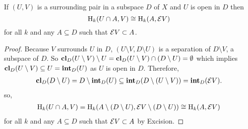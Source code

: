 \begin{lemma}\label{lem:excision}
  If $(U, V)$ is a surrounding pair in a subspace $D$ of $X$ and $U$ is open in $D$ then
  \[ \mathrm{H}_k(U\cap A, V) \cong \mathrm{H}_k(A, \mathcal{E} V) \]
  for all $k$ and any $A\subseteq D$ such that $\mathcal{E} V\subset A$.
\end{lemma}
\begin{proof}
  Because $V$ surrounds $U$ in $D$, $(U\setminus V, D\setminus U)$ is a separation of $D\setminus V$, a subspace of $D$.
  So $\mathbf{cl}_D(U\setminus V)\setminus U = \mathbf{cl}_D(U\setminus V) \cap (D\setminus U) = \emptyset$ which implies $\mathbf{cl}_D(U\setminus V)\subseteq U = \mathbf{int}_D(U)$ as $U$ is open in $D$.
  Therefore,
  \begin{align*}
    \mathbf{cl}_D(D\setminus U) = D\setminus \mathbf{int}_D(U)\subseteq\mathbf{int}_D(D\setminus (U\setminus V)) = \mathbf{int}_D(\mathcal{E} V).
  \end{align*}
  so,
  \begin{align*}
    \mathrm{H}_k(U\cap A, V) = \mathrm{H}_k(A\setminus (D\setminus U), \mathcal{E} V\setminus (D\setminus U)) \cong \mathrm{H}_k(A, \mathcal{E} V)
  \end{align*}
  for all $k$ and any $A\subseteq D$ such that $\mathcal{E} V\subset A$ by Excision.
\end{proof}
